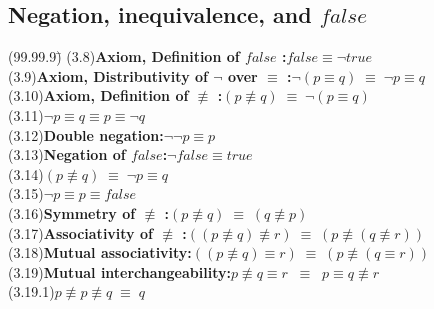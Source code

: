 \documentclass{amsart}
\newcommand{\lgap}{2pt}                             %
\newcommand{\equivs}{\ensuremath{\;\equiv\;}}       %
\newcommand{\equivss}{\ensuremath{\;\;\equiv\;\;}}  %
\newcommand{\nequiv}{\ensuremath{\not\equiv}}       %
\begin{document}
\subsection*{Negation, inequivalence, and $false$}
\begin{tabbing}
(99.99.9)\;\=\kill
(3.8)\>\textbf{Axiom, Definition of $false$ :}\quad $false\equiv \neg true$\\[\lgap]
(3.9)\>\textbf{Axiom, Distributivity of $\neg$ over $\equiv$ :}\quad $\neg (p\equiv q) \equivs \neg p \equiv q$\\[\lgap]
(3.10)\>\textbf{Axiom, Definition of $\nequiv$ :}\quad $(p\nequiv q)\equivs\neg(p\equiv q)$\\[\lgap]
(3.11)\>$\neg p \equiv q \equiv p \equiv \neg q$\\[\lgap]
(3.12)\>\textbf{Double negation:}\quad $\neg\neg p\equiv p$\\[\lgap]
(3.13)\>\textbf{Negation of $false$:}\quad $\neg false\equiv true$\\[\lgap]
(3.14)\>$(p\nequiv q)\equivs\neg p\equiv q$\\[\lgap]
(3.15)\>$\neg p\equiv p\equiv false$\\[\lgap]
(3.16)\>\textbf{Symmetry of $\nequiv$ :}\quad $(p\nequiv q) \equivs (q\nequiv p)$\\[\lgap]
(3.17)\>\textbf{Associativity of $\nequiv$ :}\quad $((p\nequiv q) \nequiv r)\equivs (p\nequiv (q\nequiv r))$\\[\lgap]
(3.18)\>\textbf{Mutual associativity:}\quad $((p\nequiv q) \equiv r)\equivs (p\nequiv (q\equiv r))$\\[\lgap]
(3.19)\>\textbf{Mutual interchangeability:}\quad $p\nequiv q \equiv r\equivss p\equiv q\nequiv r$\\
(3.19.1)\>$p\nequiv p \nequiv q\equivs q$\\
\end{tabbing}
\end{document}
